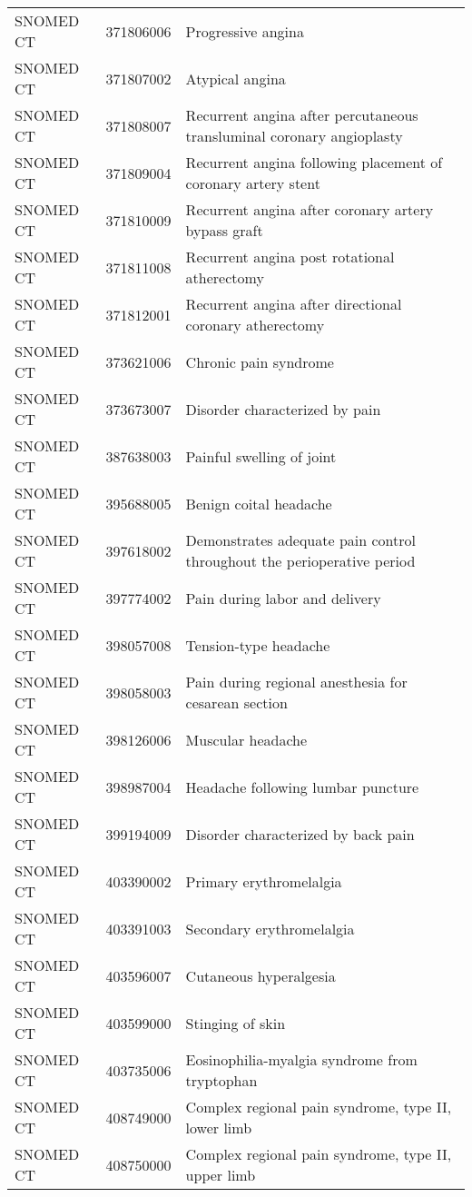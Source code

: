 \begin{longtable}{p{}p{}p{}}
  SNOMED CT & 371806006 & Progressive angina \\ 
  SNOMED CT & 371807002 & Atypical angina \\ 
  SNOMED CT & 371808007 & Recurrent angina after percutaneous transluminal coronary angioplasty \\ 
  SNOMED CT & 371809004 & Recurrent angina following placement of coronary artery stent \\ 
  SNOMED CT & 371810009 & Recurrent angina after coronary artery bypass graft \\ 
  SNOMED CT & 371811008 & Recurrent angina post rotational atherectomy \\ 
  SNOMED CT & 371812001 & Recurrent angina after directional coronary atherectomy \\ 
  SNOMED CT & 373621006 & Chronic pain syndrome \\ 
  SNOMED CT & 373673007 & Disorder characterized by pain \\ 
  SNOMED CT & 387638003 & Painful swelling of joint \\ 
  SNOMED CT & 395688005 & Benign coital headache \\ 
  SNOMED CT & 397618002 & Demonstrates adequate pain control throughout the perioperative period \\ 
  SNOMED CT & 397774002 & Pain during labor and delivery \\ 
  SNOMED CT & 398057008 & Tension-type headache \\ 
  SNOMED CT & 398058003 & Pain during regional anesthesia for cesarean section \\ 
  SNOMED CT & 398126006 & Muscular headache \\ 
  SNOMED CT & 398987004 & Headache following lumbar puncture \\ 
  SNOMED CT & 399194009 & Disorder characterized by back pain \\ 
  SNOMED CT & 403390002 & Primary erythromelalgia \\ 
  SNOMED CT & 403391003 & Secondary erythromelalgia \\ 
  SNOMED CT & 403596007 & Cutaneous hyperalgesia \\ 
  SNOMED CT & 403599000 & Stinging of skin \\ 
  SNOMED CT & 403735006 & Eosinophilia-myalgia syndrome from tryptophan \\ 
  SNOMED CT & 408749000 & Complex regional pain syndrome, type II, lower limb \\ 
  SNOMED CT & 408750000 & Complex regional pain syndrome, type II, upper limb \\ 

\end{longtable}

